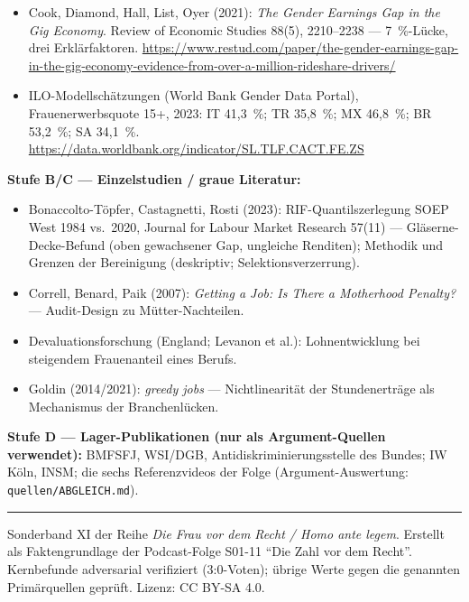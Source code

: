 \begin{itemize}
\item Cook, Diamond, Hall, List, Oyer (2021): \emph{The Gender Earnings Gap in the Gig Economy}. Review of Economic Studies 88(5), 2210--2238 --- 7~\%-L\"ucke, drei Erkl\"arfaktoren. \url{https://www.restud.com/paper/the-gender-earnings-gap-in-the-gig-economy-evidence-from-over-a-million-rideshare-drivers/}
\item ILO-Modellsch\"atzungen (World Bank Gender Data Portal), Frauenerwerbsquote 15+, 2023: IT 41,3~\%; TR 35,8~\%; MX 46,8~\%; BR 53,2~\%; SA 34,1~\%. \url{https://data.worldbank.org/indicator/SL.TLF.CACT.FE.ZS}
\end{itemize}

\textbf{Stufe B/C --- Einzelstudien / graue Literatur:}
\begin{itemize}
\item Bonaccolto-T\"opfer, Castagnetti, Rosti (2023): RIF-Quantilszerlegung SOEP West 1984 vs.\ 2020, Journal for Labour Market Research 57(11) --- Gl\"aserne-Decke-Befund (oben gewachsener Gap, ungleiche Renditen); Methodik und Grenzen der Bereinigung (deskriptiv; Selektionsverzerrung). \belegt
\item Correll, Benard, Paik (2007): \emph{Getting a Job: Is There a Motherhood Penalty?} --- Audit-Design zu M\"utter-Nachteilen. \plausibel
\item Devaluationsforschung (England; Levanon et al.): Lohnentwicklung bei steigendem Frauenanteil eines Berufs. \umstritten
\item Goldin (2014/2021): \emph{greedy jobs} --- Nichtlinearit\"at der Stundenertr\"age als Mechanismus der Branchenl\"ucken. \plausibel
\end{itemize}

\textbf{Stufe D --- Lager-Publikationen (nur als Argument-Quellen verwendet):}
BMFSFJ, WSI/DGB, Antidiskriminierungsstelle des Bundes; IW K\"oln, INSM; die
sechs Referenzvideos der Folge (Argument-Auswertung:
\texttt{quellen/ABGLEICH.md}).

\vspace{1.5em}
{\color{obsmuted}\rule{\textwidth}{0.4pt}}

{\footnotesize\color{obsmuted} Sonderband XI der Reihe \emph{Die Frau vor dem
Recht / Homo ante legem}. Erstellt als Faktengrundlage der Podcast-Folge
S01-11 \enquote{Die Zahl vor dem Recht}. Kernbefunde adversarial verifiziert
(3:0-Voten); \"ubrige Werte gegen die genannten Prim\"arquellen gepr\"uft.
Lizenz: CC BY-SA 4.0.}
